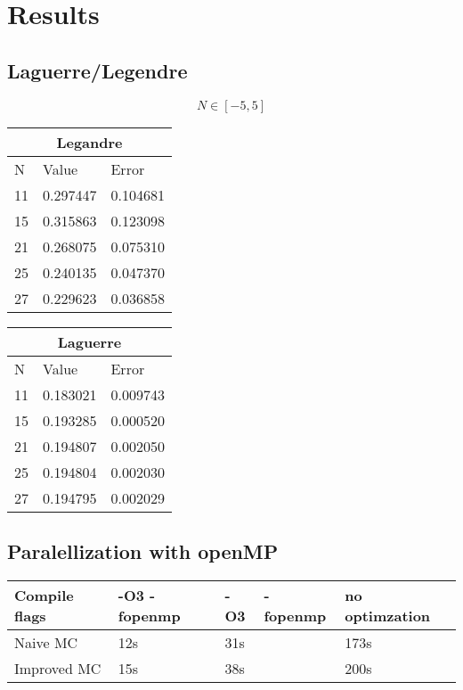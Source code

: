 \documentclass[../main.tex]{subfiles}
\begin{document}
\section{Results} \label{sec:results}
\subsection{Laguerre/Legendre} \label{sec:QMProb}


$$N \in [-5,5]$$

\begin{tabular}{ |p{1cm}|p{3cm}|p{3cm}|}
 \hline
 \multicolumn{4}{|c}{Legandre} \\
 \hline
       N   & Value & Error\\
 \hline
 11 & 0.297447 & 0.104681\\
 15 & 0.315863 & 0.123098\\
 21 & 0.268075 & 0.075310\\
 25 & 0.240135 & 0.047370\\
 27 & 0.229623 & 0.036858\\
 \hline
\end{tabular}


\begin{tabular}{ |p{1cm}|p{3cm}|p{3cm}|}
 \hline
 \multicolumn{4}{|c}{Laguerre} \\
 \hline
       N   & Value & Error\\
 \hline
 11 &  0.183021 &  0.009743\\
 15 &  0.193285 &  0.000520\\
 21 &  0.194807 &  0.002050\\
 25 &  0.194804 &  0.002030\\
 27 &  0.194795 &  0.002029\\

 \hline
\end{tabular}


\subsection{Paralellization with openMP} \label{sec:res-paralell}
\begin{table}[]
    \begin{tabular}{lllll}

        Compile flags & -O3 -fopenmp & -O3 & -fopenmp & no optimzation \\
        \hline
        Naive MC      & 12s          & 31s &          & 173s           \\
        Improved MC   & 15s          & 38s &          & 200s           
    \end{tabular}
\end{table}
\end{document}
